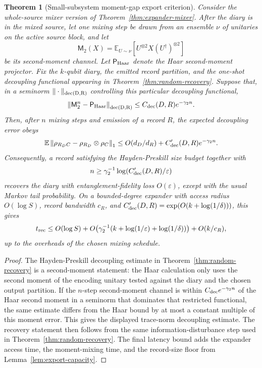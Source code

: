\documentclass[11pt]{article}
\newtheorem{theorem}{Theorem}
\begin{document}
\begin{theorem}[Small-subsystem moment-gap export criterion]
\label{thm:moment-gap-export}
Consider the whole-source mixer version of
Theorem~\ref{thm:expander-mixer}.  After the diary is in the mixed
source, let one mixing step be drawn from an ensemble $\nu$ of unitaries
on the active source block, and let
\begin{equation}
  \mathsf M_2(X)
  =
  \mathbb E_{U\sim\nu}
  \left[
    U^{\otimes 2}X(U^\dagger)^{\otimes 2}
  \right]
\end{equation}
be its second-moment channel.  Let $\mathsf P_{\rm Haar}$ denote the
Haar second-moment projector.  Fix the $k$-qubit diary, the emitted
record partition, and the one-shot decoupling functional appearing in
Theorem~\ref{thm:random-recovery}.  Suppose that, in a seminorm
$\|\cdot\|_{\rm dec(D,R)}$ controlling this particular decoupling
functional,
\begin{equation}
  \left\|
    \mathsf M_2^n-\mathsf P_{\rm Haar}
  \right\|_{\rm dec(D,R)}
  \le
  C_{\rm dec}(D,R)e^{-\gamma_2 n}.
\end{equation}
Then, after $n$ mixing steps and emission of a record $R$, the expected
decoupling error obeys
\begin{equation}
  \mathbb E
  \left\|
  \rho_{R_D C}
  -
  \rho_{R_D}\otimes\rho_C
  \right\|_1
  \le
  O(d_D/d_R)+C'_{\rm dec}(D,R)e^{-\gamma_2 n}.
\end{equation}
Consequently, a record satisfying the Hayden-Preskill size budget
together with
\begin{equation}
  n
  \ge
  \gamma_2^{-1}
  \log(C'_{\rm dec}(D,R)/\varepsilon)
\end{equation}
recovers the diary with entanglement-fidelity loss
$O(\varepsilon)$, except with the usual Markov tail probability.  On a
bounded-degree expander with access radius $O(\log S)$, record bandwidth
$c_R$, and $C'_{\rm dec}(D,R)=\exp(O(k+\log(1/\delta)))$, this gives
\begin{equation}
  t_{\rm rec}
  \le
  O(\log S)
  +
  O\!\left(
    \gamma_2^{-1}(k+\log(1/\varepsilon)+\log(1/\delta))
  \right)
  +
  O(k/c_R),
\end{equation}
up to the overheads of the chosen mixing schedule.
\end{theorem}

\begin{proof}
The Hayden-Preskill decoupling estimate in
Theorem~\ref{thm:random-recovery} is a second-moment statement: the Haar
calculation only uses the second moment of the encoding unitary tested
against the diary and the chosen output partition.  If the $n$-step
second-moment channel is within
$C_{\rm dec}e^{-\gamma_2 n}$ of the Haar second moment in a seminorm
that dominates that restricted functional, the same estimate differs
from the Haar bound by at most a constant multiple of this moment error.
This gives
the displayed trace-norm decoupling estimate.  The recovery statement
then follows from the same information-disturbance step used in
Theorem~\ref{thm:random-recovery}.  The final latency bound adds the
expander access time, the moment-mixing time, and the record-size floor
from Lemma~\ref{lem:export-capacity}.
\end{proof}
\end{document}
